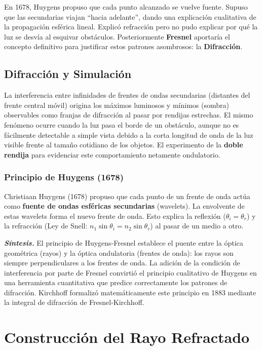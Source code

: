 \documentclass[12pt, a4paper]{article}
\theoremstyle{definition}
\begin{document}
En 1678, Huygens propuso que cada punto alcanzado se vuelve fuente. Supuso que las secundarias
viajan ``hacia adelante'', dando una explicación cualitativa de la propagación esférica lineal.
Explicó refracción pero no pudo explicar por qué la luz se desvía al esquivar obstáculos.
Posteriormente \textbf{Fresnel} aportaría el concepto definitivo para justificar estos patrones
asombrosos: la \textbf{Difracción}.

\subsection{Difracción y Simulación}

La interferencia entre infinidades de frentes de ondas secundarias (distantes del frente central
móvil) origina los máximos luminosos y mínimos (sombra) observables como franjas de difracción
al pasar por rendijas estrechas. El mismo fenómeno ocurre cuando la luz pasa el borde de un
obstáculo, aunque no es fácilmente detectable a simple vista debido a la corta longitud de onda
de la luz visible frente al tamaño cotidiano de los objetos. El experimento de la \textbf{doble
rendija} para evidenciar este comportamiento netamente ondulatorio.

\subsubsection*{Principio de Huygens (1678)}

Christiaan Huygens (1678) propuso que cada punto de un frente de onda actúa como
\textbf{fuente de ondas esféricas secundarias} (wavelets). La envolvente de estas wavelets
forma el nuevo frente de onda. Esto explica la reflexión (\(\theta_i = \theta_r\)) y la
refracción (Ley de Snell: \(n_1 \sin\theta_i = n_2 \sin\theta_r\)) al pasar de un medio a otro.

\textit{\textbf{Síntesis.}} El principio de Huygens-Fresnel establece el puente entre la
óptica geométrica (rayos) y la óptica ondulatoria (frentes de onda): los rayos son siempre
perpendiculares a los frentes de onda. La adición de la condición de interferencia por parte
de Fresnel convirtió el principio cualitativo de Huygens en una herramienta cuantitativa que
predice correctamente los patrones de difracción. Kirchhoff formalizó matemáticamente este
principio en 1883 mediante la integral de difracción de Fresnel-Kirchhoff.

\section{Construcción del Rayo Refractado}
\label{sec:construccion_rayo}
\end{document}
